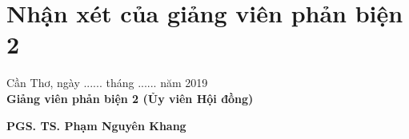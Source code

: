 \chapter*{\centering Nhận xét của giảng viên phản biện 2 }
\vspace{6mm}
\noindent
\begin{flushright}
Cần Thơ, ngày ...... tháng ...... năm 2019 \\
\textbf{Giảng viên phản biện 2 (Ủy viên Hội đồng)}\\
\end{flushright}
\vspace{12mm}
\begin{flushright}
\textbf{PGS. TS. Phạm Nguyên Khang}
\end{flushright} 